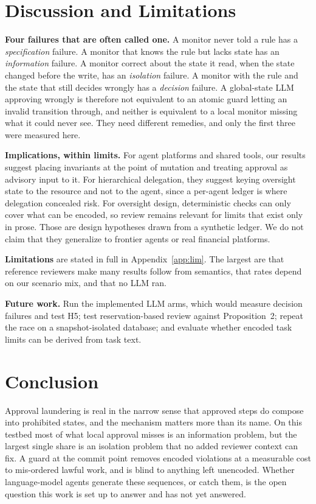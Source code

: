 \documentclass[10pt]{article}
\begin{document}
\section{Discussion and Limitations}
\textbf{Four failures that are often called one.} A monitor never told a rule has a \emph{specification} failure. A monitor that knows the rule but lacks state has an \emph{information} failure. A monitor correct about the state it read, when the state changed before the write, has an \emph{isolation} failure. A monitor with the rule and the state that still decides wrongly has a \emph{decision} failure. A global-state LLM approving wrongly is therefore not equivalent to an atomic guard letting an invalid transition through, and neither is equivalent to a local monitor missing what it could never see. They need different remedies, and only the first three were measured here.

\textbf{Implications, within limits.} For agent platforms and shared tools, our results suggest placing invariants at the point of mutation and treating approval as advisory input to it. For hierarchical delegation, they suggest keying oversight state to the resource and not to the agent, since a per-agent ledger is where delegation concealed risk. For oversight design, deterministic checks can only cover what can be encoded, so review remains relevant for limits that exist only in prose. Those are design hypotheses drawn from a synthetic ledger. We do not claim that they generalize to frontier agents or real financial platforms.

\textbf{Limitations} are stated in full in Appendix~\ref{app:lim}. The largest are that reference reviewers make many results follow from semantics, that rates depend on our scenario mix, and that no LLM ran.

\textbf{Future work.} Run the implemented LLM arms, which would measure decision failures and test H5; test reservation-based review against Proposition~2; repeat the race on a snapshot-isolated database; and evaluate whether encoded task limits can be derived from task text.

\section{Conclusion}
Approval laundering is real in the narrow sense that approved steps do compose into prohibited states, and the mechanism matters more than its name. On this testbed most of what local approval misses is an information problem, but the largest single share is an isolation problem that no added reviewer context can fix. A guard at the commit point removes encoded violations at a measurable cost to mis-ordered lawful work, and is blind to anything left unencoded. Whether language-model agents generate these sequences, or catch them, is the open question this work is set up to answer and has not yet answered.
\end{document}
